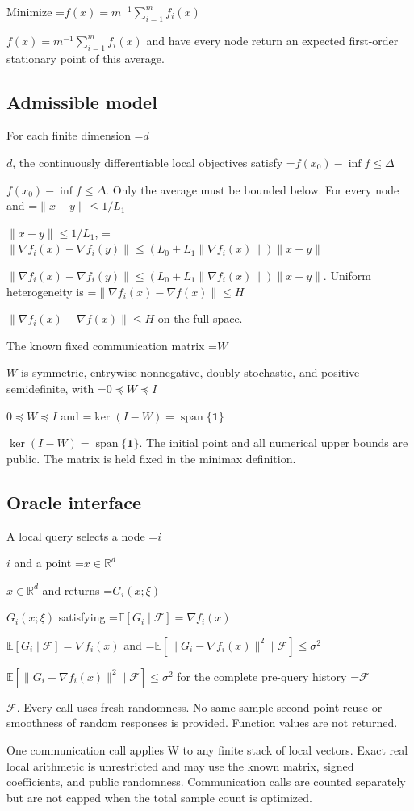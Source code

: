 \documentclass[10pt,a4paper]{article}
\newcommand{\AtlasMath}[1]{\par\begingroup\centering\setbox0=\hbox{$\displaystyle #1$}\ifdim\wd0>1.4\linewidth\typeout{ATLAS WIDE FORMULA: \the\wd0}\fi\ifdim\wd0>\linewidth\resizebox{\linewidth}{!}{\box0}\else\box0\fi\par\endgroup}
\newcommand{\AtlasInlineMath}[1]{\begingroup\setbox0=\hbox{$#1$}\ifdim\wd0>.4\linewidth\endgroup\AtlasMath{#1}\else\endgroup$#1$\fi}
\begin{document}
Minimize \AtlasInlineMath{f(x)=m^{-1}\sum_{i=1}^m f_i(x)} and have every node return an expected first-order stationary point of this average.



\subsection{Admissible model}


For each finite dimension \AtlasInlineMath{d}, the continuously differentiable local objectives satisfy \AtlasInlineMath{f(x_0)-\inf f\le\Delta}. Only the average must be bounded below. For every node and \AtlasInlineMath{\|x-y\|\le1/L_1}, \AtlasInlineMath{\|\nabla f_i(x)-\nabla f_i(y)\|\le(L_0+L_1\|\nabla f_i(x)\|)\|x-y\|}. Uniform heterogeneity is \AtlasInlineMath{\|\nabla f_i(x)-\nabla f(x)\|\le H} on the full space.



The known fixed communication matrix \AtlasInlineMath{W} is symmetric, entrywise nonnegative, doubly stochastic, and positive semidefinite, with \AtlasInlineMath{0\preceq W\preceq I} and \AtlasInlineMath{\ker(I-W)=\operatorname{span}\{\mathbf1\}}. The initial point and all numerical upper bounds are public. The matrix is held fixed in the minimax definition.



\subsection{Oracle interface}


A local query selects a node \AtlasInlineMath{i} and a point \AtlasInlineMath{x\in\mathbb R^d} and returns \AtlasInlineMath{G_i(x;\xi)} satisfying \AtlasInlineMath{\mathbb E[G_i\mid\mathcal F]=\nabla f_i(x)} and \AtlasInlineMath{\mathbb E[\|G_i-\nabla f_i(x)\|^2\mid\mathcal F]\le\sigma^2} for the complete pre-query history \AtlasInlineMath{\mathcal F}. Every call uses fresh randomness. No same-sample second-point reuse or smoothness of random responses is provided. Function values are not returned.



One communication call applies W to any finite stack of local vectors. Exact real local arithmetic is unrestricted and may use the known matrix, signed coefficients, and public randomness. Communication calls are counted separately but are not capped when the total sample count is optimized.
\end{document}
